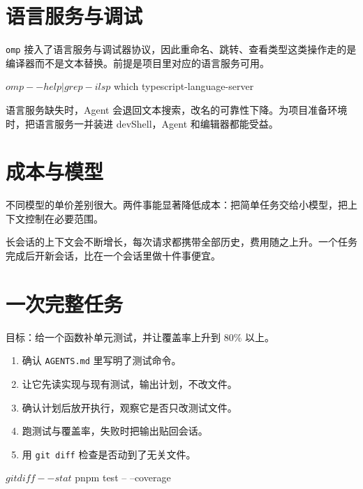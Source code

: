 \section{语言服务与调试}

\texttt{omp} 接入了语言服务与调试器协议，因此重命名、跳转、查看类型这类操作走的是编译器而不是文本替换。前提是项目里对应的语言服务可用。

\begin{shellsession}
$ omp --help | grep -i lsp
$ which typescript-language-server
\end{shellsession}

语言服务缺失时，Agent 会退回文本搜索，改名的可靠性下降。为项目准备环境时，把语言服务一并装进 devShell，Agent 和编辑器都能受益。

\section{成本与模型}

不同模型的单价差别很大。两件事能显著降低成本：把简单任务交给小模型，把上下文控制在必要范围。


长会话的上下文会不断增长，每次请求都携带全部历史，费用随之上升。一个任务完成后开新会话，比在一个会话里做十件事便宜。

\section{一次完整任务}

目标：给一个函数补单元测试，并让覆盖率上升到 80\% 以上。

\begin{enumerate}
  \item 确认 \texttt{AGENTS.md} 里写明了测试命令。
  \item 让它先读实现与现有测试，输出计划，不改文件。
  \item 确认计划后放开执行，观察它是否只改测试文件。
  \item 跑测试与覆盖率，失败时把输出贴回会话。
  \item 用 \texttt{git diff} 检查是否动到了无关文件。
\end{enumerate}

\begin{shellsession}
$ git diff --stat
$ pnpm test -- --coverage
\end{shellsession}

